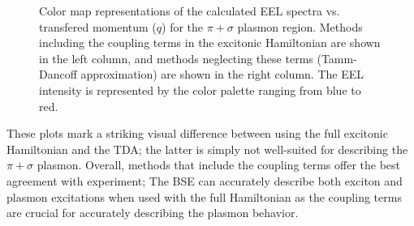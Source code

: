 \documentclass[aps,prb,10pt,superscriptaddress,notitlepage,endfloats]{revtex4-1}
\begin{document}
\begin{figure}[t]
\centering
{}
\hfill
{}
\caption{Color map representations of the calculated EEL spectra vs. transfered
momentum ($q$) for the $\pi + \sigma$ plasmon region. Methods including the
coupling terms in the excitonic Hamiltonian are shown in the left column, and
methods neglecting these terms (Tamm-Dancoff approximation) are shown in the
right column. The EEL intensity is represented by the color palette ranging from
blue to red.}
\label{fig:heatmaps}
\end{figure}

These plots mark a striking visual difference between using the full excitonic
Hamiltonian and the TDA; the latter is simply not well-suited for describing
the $\pi + \sigma$ plasmon. Overall, methods that include the coupling terms
offer the best agreement with experiment;
The BSE can accurately describe both exciton and plasmon excitations when used with
the full Hamiltonian as the coupling terms are crucial for accurately describing
the plasmon behavior.
\end{document}
